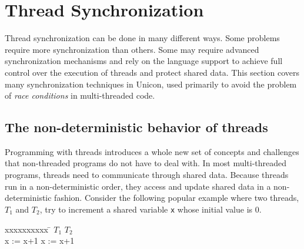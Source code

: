 \section{Thread Synchronization}

Thread synchronization can be done in many different ways. Some
problems require more synchronization than others. Some may require
advanced synchronization mechanisms and rely on the language support
to achieve full control over the execution of threads and protect
shared data. This section covers many synchronization techniques in
Unicon, used primarily to avoid the problem of {\em race conditions\/}
in multi-threaded code.

\subsection*{The non-deterministic behavior of threads}

Programming with threads introduces a whole new set of concepts and
challenges that non-threaded programs do not have to deal with.  In
most multi-threaded programs, threads need to communicate through
shared data. Because threads run in a non-deterministic order, they
access and update shared data in a non-deterministic fashion.
Consider the following popular example where two threads, $T_1$ and
$T_2$, try to increment a shared variable \texttt{x} whose initial
value is 0.

\begin{tabbing}
  xxxxxxxxxx \= \kill
  $T_1$ \> $T_2$ \\
  x := x+1 \> x := x+1
\end{tabbing}

